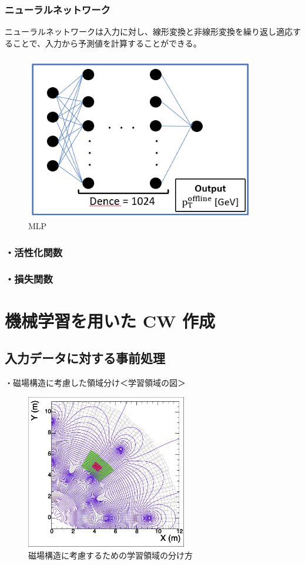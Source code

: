 \subsubsection{ニューラルネットワーク}
ニューラルネットワークは入力に対し、線形変換と非線形変換を繰り返し適応することで、入力から予測値を計算することができる。
\begin{figure}[tb]
  \centering
  \includegraphics[clip, width=10cm]{fig/4/MLP.png}
  \caption{MLP}
  \label{fig:Resolution}
\end{figure}

\subsubsection{・活性化関数}
\subsubsection{・損失関数}

\section{機械学習を用いた CW 作成}
\subsection{入力データに対する事前処理}
・磁場構造に考慮した領域分け＜学習領域の図＞\\
\begin{figure}[tb]
  \centering
  \includegraphics[clip, width=7cm]{fig/4/c1_withMag.pdf}
  \caption{磁場構造に考慮するための学習領域の分け方}
  \label{fig:Mag}
\end{figure}

